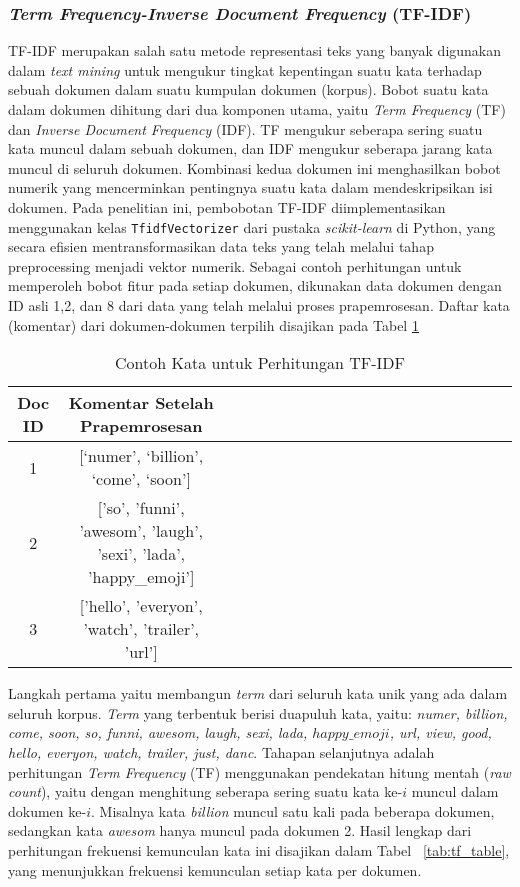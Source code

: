 \documentclass[a4paper,12pt]{report}
\numberwithin{equation}{chapter}
\begin{document}
\subsubsection{\textit{Term Frequency-Inverse Document Frequency} (TF-IDF)}
TF-IDF merupakan salah satu metode representasi teks yang banyak digunakan dalam \textit{text mining} untuk mengukur tingkat kepentingan suatu kata terhadap sebuah dokumen dalam suatu kumpulan dokumen (korpus). Bobot suatu kata dalam dokumen dihitung dari dua komponen utama, yaitu \textit{Term Frequency} (TF) dan \textit{Inverse Document Frequency} (IDF). TF mengukur seberapa sering suatu kata muncul dalam sebuah dokumen, dan IDF mengukur seberapa jarang kata muncul di seluruh dokumen. Kombinasi kedua dokumen ini menghasilkan bobot numerik yang mencerminkan pentingnya suatu kata dalam mendeskripsikan isi dokumen. Pada penelitian ini, pembobotan TF-IDF diimplementasikan menggunakan kelas \texttt{TfidfVectorizer} dari pustaka \textit{scikit-learn} di Python, yang secara efisien mentransformasikan data teks yang telah melalui tahap preprocessing menjadi vektor numerik. Sebagai contoh perhitungan untuk memperoleh bobot fitur pada setiap dokumen, dikunakan data dokumen dengan ID asli 1,2, dan 8 dari data yang telah melalui proses prapemrosesan. Daftar kata (komentar) dari dokumen-dokumen terpilih disajikan pada Tabel \ref{tab:tf-idf}

\begin{table}[h]
\centering
\caption{Contoh Kata untuk Perhitungan TF-IDF}
\label{tab:tf-idf}
{%
\begin{tabular}{c|*{19}{c}}
\hline
\textbf{Doc ID} & \textbf{Komentar Setelah Prapemrosesan}  \\
\hline
1 & [`numer', `billion', `come', `soon'] \\
\hline
2 & ['so', 'funni', 'awesom', 'laugh', 'sexi', 'lada', 'happy\_emoji'] \\
\hline
3 & ['hello', 'everyon', 'watch', 'trailer', 'url'] \\
\hline
\end{tabular}
}
\end{table}

Langkah pertama yaitu membangun \textit{term} dari seluruh kata unik yang ada dalam seluruh korpus. \textit{Term} yang terbentuk berisi duapuluh kata, yaitu:\textit{ numer, billion, come, soon, so, funni, awesom, laugh, sexi, lada, $happy\_emoji$, url, view, good, hello, everyon, watch, trailer, just, danc}. Tahapan selanjutnya adalah perhitungan \textit{Term Frequency} (TF) menggunakan pendekatan hitung mentah (\textit{raw count}), yaitu dengan menghitung seberapa sering suatu kata ke-$i$ muncul dalam dokumen ke-$i$.  Misalnya kata \textit{billion} muncul satu kali pada beberapa dokumen, sedangkan kata \textit{awesom} hanya muncul pada dokumen 2. Hasil lengkap dari perhitungan frekuensi kemunculan kata ini disajikan dalam Tabel ~\ref{tab:tf_table}, yang menunjukkan frekuensi kemunculan setiap kata per dokumen.
\end{document}
